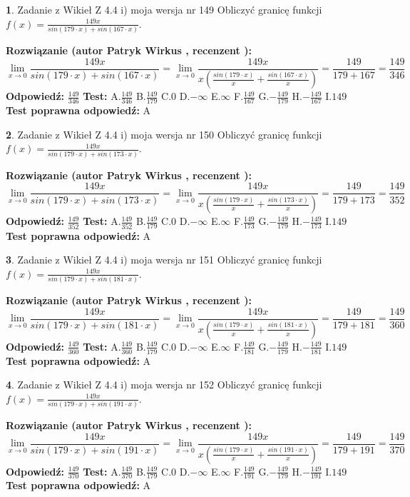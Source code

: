 \documentclass[12pt, a4paper]{article}
\theoremstyle{definition} %
\newtheorem{zad}{}
\newcommand{\zadStart}[1]{\begin{zad}#1\newline}
\newcommand{\zadStop}{\end{zad}}
\newcommand{\rozwStart}[2]{\noindent \textbf{Rozwiązanie (autor #1 , recenzent #2): }\newline}
\newcommand{\rozwStop}{\newline}
\newcommand{\odpStart}{\noindent \textbf{Odpowiedź:}\newline}
\newcommand{\odpStop}{\newline}
\newcommand{\testStart}{\noindent \textbf{Test:}\newline}
\newcommand{\testStop}{\newline}
\newcommand{\kluczStart}{\noindent \textbf{Test poprawna odpowiedź:}\newline}
\newcommand{\kluczStop}{\newline}
\begin{document}
\zadStart{Zadanie z Wikieł Z 4.4 i) moja wersja nr 149}
Obliczyć granicę funkcji $f(x)=\frac{149x}{sin(179\cdot x) +sin(167\cdot x)}$.
\zadStop
\rozwStart{Patryk Wirkus}{}
$$\lim\limits_{x\to 0}\frac{149x}{sin(179\cdot x) +sin(167\cdot x)}=\lim\limits_{x\to 0}\frac{149x}{x(\frac{sin(179\cdot x)}{x}+\frac{sin(167\cdot x)}{x})}=\frac{149}{179+167} = \frac{149}{346}$$
\rozwStop
\odpStart
$\frac{149}{346}$
\odpStop
\testStart
A.$\frac{149}{346}$
B.$\frac{149}{179}$
C.$0$
D.$-\infty$
E.$\infty$
F.$\frac{149}{167}$
G.$-\frac{149}{179}$
H.$-\frac{149}{167}$
I.$149$
\testStop
\kluczStart
A
\kluczStop



\zadStart{Zadanie z Wikieł Z 4.4 i) moja wersja nr 150}
Obliczyć granicę funkcji $f(x)=\frac{149x}{sin(179\cdot x) +sin(173\cdot x)}$.
\zadStop
\rozwStart{Patryk Wirkus}{}
$$\lim\limits_{x\to 0}\frac{149x}{sin(179\cdot x) +sin(173\cdot x)}=\lim\limits_{x\to 0}\frac{149x}{x(\frac{sin(179\cdot x)}{x}+\frac{sin(173\cdot x)}{x})}=\frac{149}{179+173} = \frac{149}{352}$$
\rozwStop
\odpStart
$\frac{149}{352}$
\odpStop
\testStart
A.$\frac{149}{352}$
B.$\frac{149}{179}$
C.$0$
D.$-\infty$
E.$\infty$
F.$\frac{149}{173}$
G.$-\frac{149}{179}$
H.$-\frac{149}{173}$
I.$149$
\testStop
\kluczStart
A
\kluczStop



\zadStart{Zadanie z Wikieł Z 4.4 i) moja wersja nr 151}
Obliczyć granicę funkcji $f(x)=\frac{149x}{sin(179\cdot x) +sin(181\cdot x)}$.
\zadStop
\rozwStart{Patryk Wirkus}{}
$$\lim\limits_{x\to 0}\frac{149x}{sin(179\cdot x) +sin(181\cdot x)}=\lim\limits_{x\to 0}\frac{149x}{x(\frac{sin(179\cdot x)}{x}+\frac{sin(181\cdot x)}{x})}=\frac{149}{179+181} = \frac{149}{360}$$
\rozwStop
\odpStart
$\frac{149}{360}$
\odpStop
\testStart
A.$\frac{149}{360}$
B.$\frac{149}{179}$
C.$0$
D.$-\infty$
E.$\infty$
F.$\frac{149}{181}$
G.$-\frac{149}{179}$
H.$-\frac{149}{181}$
I.$149$
\testStop
\kluczStart
A
\kluczStop



\zadStart{Zadanie z Wikieł Z 4.4 i) moja wersja nr 152}
Obliczyć granicę funkcji $f(x)=\frac{149x}{sin(179\cdot x) +sin(191\cdot x)}$.
\zadStop
\rozwStart{Patryk Wirkus}{}
$$\lim\limits_{x\to 0}\frac{149x}{sin(179\cdot x) +sin(191\cdot x)}=\lim\limits_{x\to 0}\frac{149x}{x(\frac{sin(179\cdot x)}{x}+\frac{sin(191\cdot x)}{x})}=\frac{149}{179+191} = \frac{149}{370}$$
\rozwStop
\odpStart
$\frac{149}{370}$
\odpStop
\testStart
A.$\frac{149}{370}$
B.$\frac{149}{179}$
C.$0$
D.$-\infty$
E.$\infty$
F.$\frac{149}{191}$
G.$-\frac{149}{179}$
H.$-\frac{149}{191}$
I.$149$
\testStop
\kluczStart
A
\kluczStop
\end{document}

